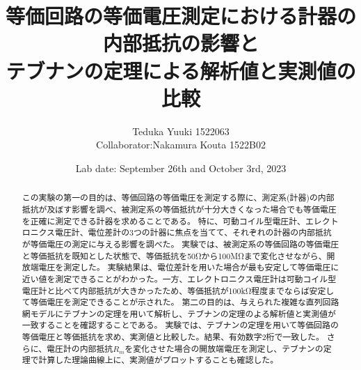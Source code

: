 \documentclass[a4paper,10pt]{jsarticle}
\begin{document}
\title{{等価回路の等価電圧測定における計器の内部抵抗の影響と\\テブナンの定理による解析値と実測値の比較}}
\author{Teduka Yuuki 1522063 
\\
Collaborator:Nakamura Kouta 1522B02 }
\date{Lab date: September 26th and October 3rd, 2023}
\maketitle

\begin{abstract}
  この実験の第一の目的は、等価回路の等価電圧を測定する際に、測定系(計器)の内部抵抗が及ぼす影響を調べ、被測定系の等価抵抗が十分大きくなった場合でも等価電圧を正確に測定できる計器を求めることである。
  特に、可動コイル型電圧計、エレクトロニクス電圧計、電位差計の3つの計器に焦点を当てて、それぞれの計器の内部抵抗が等価電圧の測定に与える影響を調べた。
  実験では、被測定系の等価回路の等価電圧と等価抵抗を既知とした状態で、等価抵抗を50Ωから100MΩまで変化させながら、開放端電圧を測定した。
  実験結果は、電位差計を用いた場合が最も安定して等価電圧に近い値を測定できることがわかった。一方、エレクトロニクス電圧計は可動コイル型電圧計と比べて内部抵抗が大きかったため、等価抵抗が100kΩ程度までならば安定して等価電圧を測定できることが示された。
  第二の目的は、与えられた複雑な直列回路網モデルにテブナンの定理を用いて解析し、テブナンの定理のよる解析値と実測値が一致することを確認することである。
  実験では、テブナンの定理を用いて等価回路の等価電圧と等価抵抗を求め、実測値と比較した。結果、有効数字2桁で一致した。
  さらに、電圧計の内部抵抗$R_m$を変化させた場合の開放端電圧を測定し、テブナンの定理で計算した理論曲線上に、実測値がプロットすることも確認した。

\end{abstract}
\end{document}
